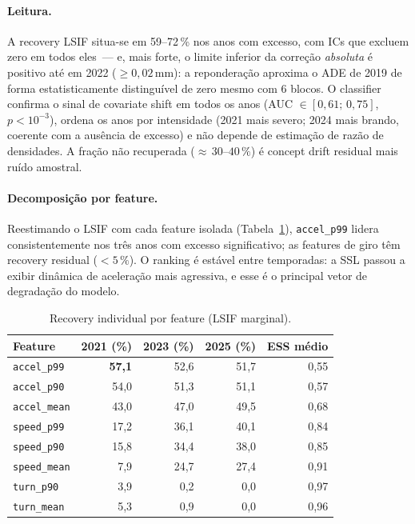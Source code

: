 \documentclass[runningheads]{llncs}
\begin{document}
\paragraph{Leitura.}
A recovery LSIF situa-se em 59--72\,\% nos anos com excesso, com ICs que excluem zero em todos eles~--- e, mais forte, o limite inferior da corre\c{c}\~ao \emph{absoluta} \'e positivo at\'e em 2022 ($\geq 0{,}02$\,mm): a repondera\c{c}\~ao aproxima o ADE de 2019 de forma estatisticamente distingu\'ivel de zero mesmo com 6 blocos. O classifier confirma o sinal de covariate shift em todos os anos (AUC $\in [0{,}61;\,0{,}75]$, $p<10^{-3}$), ordena os anos por intensidade (2021 mais severo; 2024 mais brando, coerente com a aus\^encia de excesso) e n\~ao depende de estima\c{c}\~ao de raz\~ao de densidades. A fra\c{c}\~ao n\~ao recuperada (${\approx}\,30$--$40\,\%$) \'e concept drift residual mais ru\'ido amostral.

\paragraph{Decomposi\c{c}\~ao por feature.}
Reestimando o LSIF com cada feature isolada (Tabela~\ref{tab:iw_feat}), \texttt{accel\_p99} lidera consistentemente nos tr\^es anos com excesso significativo; as features de giro t\^em recovery residual ($<5\,\%$). O ranking \'e est\'avel entre temporadas: a SSL passou a exibir din\^amica de acelera\c{c}\~ao mais agressiva, e esse \'e o principal vetor de degrada\c{c}\~ao do modelo.

\begin{table}[t]
\centering
\caption{Recovery individual por feature (LSIF marginal).}
\label{tab:iw_feat}
\small
\begin{tabular}{lrrrr}
\toprule
\textbf{Feature} & \textbf{2021 (\%)} & \textbf{2023 (\%)} & \textbf{2025 (\%)} & \textbf{ESS m\'edio} \\
\midrule
\texttt{accel\_p99}  & \textbf{57{,}1} & 52{,}6 & 51{,}7 & 0{,}55 \\
\texttt{accel\_p90}  & 54{,}0          & 51{,}3 & 51{,}1 & 0{,}57 \\
\texttt{accel\_mean} & 43{,}0          & 47{,}0 & 49{,}5 & 0{,}68 \\
\texttt{speed\_p99}  & 17{,}2          & 36{,}1 & 40{,}1 & 0{,}84 \\
\texttt{speed\_p90}  & 15{,}8          & 34{,}4 & 38{,}0 & 0{,}85 \\
\texttt{speed\_mean} &  7{,}9          & 24{,}7 & 27{,}4 & 0{,}91 \\
\texttt{turn\_p90}   &  3{,}9          &  0{,}2 &   0{,}0 & 0{,}97 \\
\texttt{turn\_mean}  &  5{,}3          &  0{,}9 &   0{,}0 & 0{,}96 \\
\bottomrule
\end{tabular}
\end{table}
\end{document}
